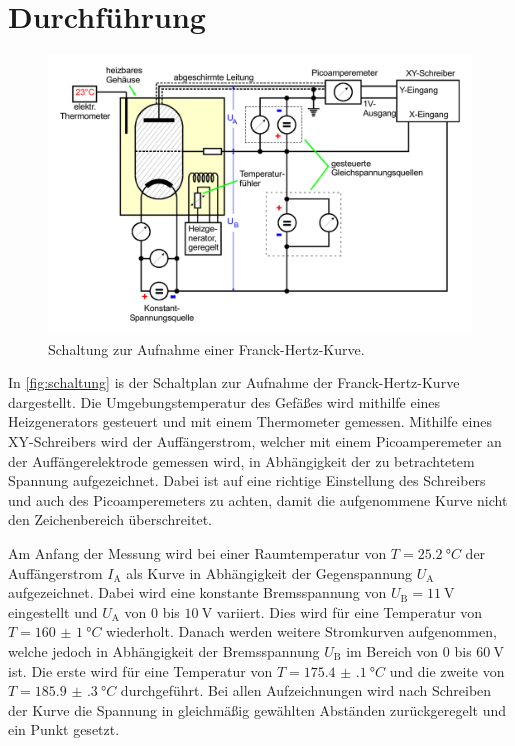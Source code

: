 \section{Durchführung}
\label{sec:Durchführung}

\begin{figure}[H]
    \centering
    \includegraphics[width=0.8\linewidth]{pictures/schaltplan.pdf}
    \caption{Schaltung zur Aufnahme einer Franck-Hertz-Kurve. \cite{v601}}
    \label{fig:schaltung}
\end{figure}

In \autoref{fig:schaltung} is der Schaltplan zur Aufnahme der Franck-Hertz-Kurve dargestellt.
Die Umgebungstemperatur des Gefäßes wird mithilfe eines Heizgenerators gesteuert und mit einem Thermometer gemessen.
Mithilfe eines XY-Schreibers wird der Auffängerstrom, welcher mit einem Picoamperemeter an der Auffängerelektrode gemessen wird,
in Abhängigkeit der zu betrachtetem Spannung aufgezeichnet.
Dabei ist auf eine richtige Einstellung des Schreibers und auch des Picoamperemeters zu achten, damit die aufgenommene Kurve nicht den Zeichenbereich überschreitet.

Am Anfang der Messung wird bei einer Raumtemperatur von $T = \qty{25,2}{°C}$ der Auffängerstrom $I_\text{A}$ als Kurve in Abhängigkeit der Gegenspannung $U_\text{A}$ aufgezeichnet.
Dabei wird eine konstante Bremsspannung von $U_\text{B} = \qty{11}{\volt}$ eingestellt und $U_\text{A}$ von 0 bis $\qty{10}{\volt}$ variiert.
Dies wird für eine Temperatur von $T = \qty{160(1)}{°C}$ wiederholt. 
Danach werden weitere Stromkurven aufgenommen, welche jedoch in Abhängigkeit der Bremsspannung $U_\text{B}$ im Bereich von 0 bis $\qty{60}{\volt}$ ist.
Die erste wird für eine Temperatur von $T = \qty{175.4(1)}{°C}$ und die zweite von $T = \qty{185.9(3)}{°C}$ durchgeführt.
Bei allen Aufzeichnungen wird nach Schreiben der Kurve die Spannung in gleichmäßig gewählten Abständen zurückgeregelt und ein Punkt gesetzt.
